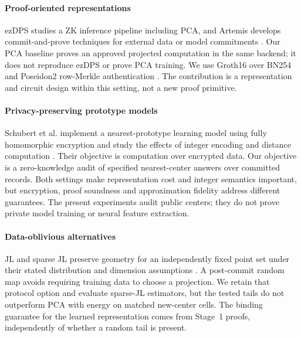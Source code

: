 \paragraph{Proof-oriented representations}
ezDPS studies a ZK inference pipeline including PCA, and Artemis develops commit-and-prove techniques for external data or model commitments \cite{ezdps2023,artemis2024}. Our PCA baseline proves an approved projected computation in the same backend; it does not reproduce ezDPS or prove PCA training. We use Groth16 over BN254 and Poseidon2 row-Merkle authentication \cite{groth2016,poseidon22023}. The contribution is a representation and circuit design within this setting, not a new proof primitive.

\paragraph{Privacy-preserving prototype models}
Schubert et al. implement a nearest-prototype learning model using fully homomorphic encryption and study the effects of integer encoding and distance computation \cite{schubert2026prototype}. Their objective is computation over encrypted data. Our objective is a zero-knowledge audit of specified nearest-center answers over committed records. Both settings make representation cost and integer semantics important, but encryption, proof soundness and approximation fidelity address different guarantees. The present experiments audit public centers; they do not prove private model training or neural feature extraction.

\paragraph{Data-oblivious alternatives}
JL and sparse JL preserve geometry for an independently fixed point set under their stated distribution and dimension assumptions \cite{johnson1984extensions,achlioptas2003database,kane2014sparser,makarychev2019performance}. A post-commit random map avoids requiring training data to choose a projection. We retain that protocol option and evaluate sparse-JL estimators, but the tested tails do not outperform PCA with energy on matched new-center cells. The binding guarantee for the learned representation comes from Stage~1 proofs, independently of whether a random tail is present.
